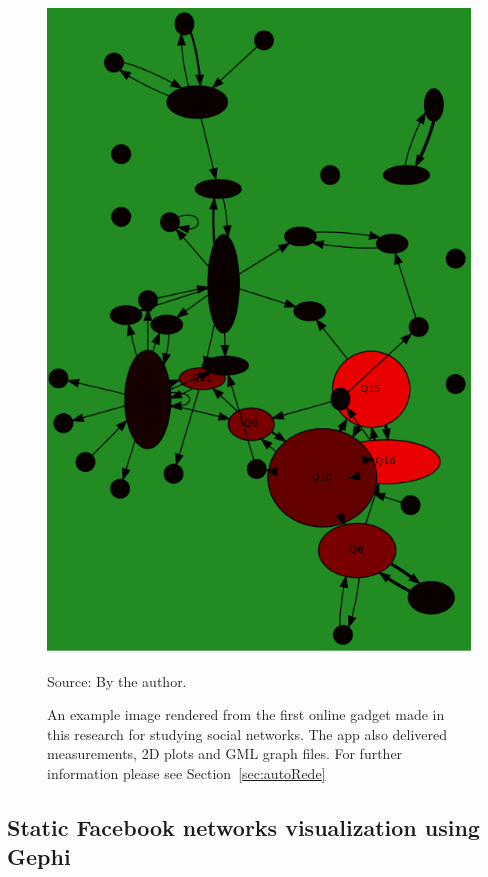 \begin{apendicesenv}
\begin{figure}[h!]
\begin{center}
\includegraphics[scale=.25]{figs/autoRede_}
\caption{An example image rendered from the first online gadget made in this research for studying social networks.
	The app also delivered measurements, 2D plots and GML graph files. For further information please see Section~\ref{sec:autoRede}}
\label{fig:autoRede}
\begin{flushleft}\footnotesize
Source: By the author.\
\end{flushleft}
\end{center}
\end{figure}

	\subsection{Static Facebook networks visualization using Gephi}

\end{apendicesenv}
